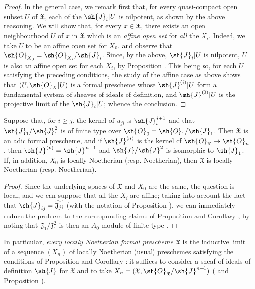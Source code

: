 \begin{proof}
In the general case, we remark first that, for every quasi-compact open subset $U$ of $\mathfrak{X}$, each of the $\sh{J}_i|U$ is nilpotent, as shown by the above reasoning.
We will show that, for every $x\in\mathfrak{X}$, there exists an open neighbourhood $U$ of $x$ in $\mathfrak{X}$ which is an \emph{affine open set} for \emph{all} the $X_i$.
Indeed, we take $U$ to be an affine open set for $X_0$, and observe that $\sh{O}_{X_0}=\sh{O}_{X_i}/\sh{J}_i$.
Since, by the above, $\sh{J}_i|U$ is nilpotent, $U$ is also an affine open set for each $X_i$, by Proposition .
This being so, for each $U$ satisfying the preceding conditions, the study of the affine case as above shows that $(U,\sh{O}_X|U)$ is a formal prescheme whose $\sh{J}^{(i)}|U$ form a fundamental system of sheaves of ideals of definition, and $\sh{J}^{(0)}|U$ is the projective limit of the $\sh{J}_i|U$; whence the conclusion.
\end{proof}

\begin{corollary}[10.6.4]
\label{I.10.6.4}
Suppose that, for $i\geq j$, the kernel of $u_{ji}$ is $\sh{J}_i^{j+1}$ and that $\sh{J}_1/\sh{J}_1^2$
is of finite type over $\sh{O}_0=\sh{O}_1/\sh{J}_1$.
Then $\mathfrak{X}$ is an adic formal prescheme, and if $\sh{J}^{(n)}$ is the kernel of $\sh{O}_\mathfrak{X}\to\sh{O}_n$, then $\sh{J}^{(n)}=\sh{J}^{n+1}$ and $\sh{J}/\sh{J}^2$ is isomorphic to $\sh{J}_1$.
If, in addition, $X_0$ is locally Noetherian (resp. Noetherian), then $\mathfrak{X}$ is locally Noetherian (resp. Noetherian).
\end{corollary}

\begin{proof}
Since the underlying spaces of $\mathfrak{X}$ and $X_0$ are the same, the question is local, and we can suppose that all the $X_i$ are affine; taking into account the fact that $\sh{J}_{ij}=\widetilde{\mathfrak{J}_{ji}}$ (with the notation of Proposition ), we can immediately reduce the problem to the corresponding claims of Proposition  and Corollary , by noting that $\mathfrak{J}_1/\mathfrak{J}_1^2$ is then an $A_0$-module of finite type .
\end{proof}

In particular, \emph{every locally Noetherian formal prescheme $\mathfrak{X}$} is the inductive limit of a sequence $(X_n)$ of locally Noetherian (usual) preschemes satisfying the conditions of Proposition  and Corollary : it suffices to consider a sheaf of ideals of definition $\sh{J}$ for $\mathfrak{X}$  and to take $X_n=(\mathfrak{X},\sh{O}_\mathfrak{X}/\sh{J}^{n+1})$ ( and Proposition ).

